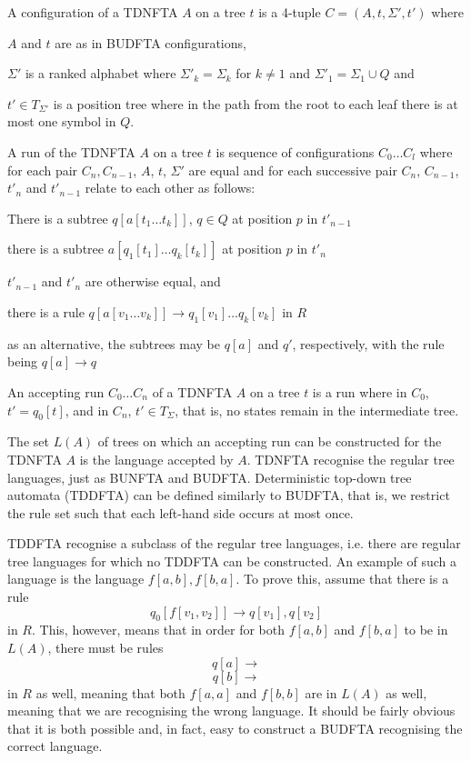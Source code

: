 A configuration of a TDNFTA $A$ on a tree $t$ is a 4-tuple $C = (A, t, \Sigma', t')$
where 
\begin{compactitem}
\item $A$ and $t$ are as in BUDFTA configurations,
\item $\Sigma'$ is a ranked alphabet where $\Sigma'_k = \Sigma_k$ for $k \neq 1$ and
$\Sigma'_1 = \Sigma_1 \cup Q$ and
\item $t' \in T_{\Sigma'}$ is a position tree where in the path from the
root to each leaf there is at most one symbol in $Q$.
\end{compactitem}
\vspace{0.5cm}

A run of the TDNFTA $A$ on a tree $t$ is sequence of configurations $C_0
\ldots C_l$ where for each pair $C_n, C_{n-1}$, $A$, $t$, $\Sigma'$ are
equal and for each successive pair $C_n$, $C_{n-1}$, $t'_n$ and $t'_{n-1}$
relate to each other as follows: 
\begin{compactitem}
\item There is a subtree $q[a[t_1 \ldots t_k]]$, $q \in Q$ at position $p$
in $t'_{n-1}$
\item there is a subtree $a[q_1[t_1] \ldots q_k[t_k]]$ at position $p$ in
$t'_{n}$
\item $t'_{n-1}$ and $t'_n$ are otherwise equal, and
\item there is a rule $q[a[v_1 \ldots v_k]] \rightarrow q_1[v_1] \ldots
q_k[v_k]$ in $R$ 
\item as an alternative, the subtrees may be $q[a]$ and $q'$, respectively,
with the rule being $q[a] \rightarrow q$
\end{compactitem}
\vspace{0.5cm}

An accepting run ${C_0 \ldots C_n}$ of a TDNFTA $A$ on a tree $t$ is a run
where in $C_0$, $t' = q_0[t]$, and in $C_n$, $t' \in T_\Sigma$, that is, no
states remain in the intermediate tree.

The set $L(A)$ of trees on which an accepting run can be constructed for the
TDNFTA $A$ is the language accepted by $A$. TDNFTA recognise the regular
tree languages, just as BUNFTA and BUDFTA. Deterministic top-down tree
automata (TDDFTA) can be defined similarly to BUDFTA, that is, we restrict
the rule set such that each left-hand side occurs at most once.

TDDFTA recognise a subclass of the regular tree languages, i.e. there are
regular tree languages for which no TDDFTA can be constructed. An example
of such a language is the language ${f[a,b], f[b,a]}$. To prove this,
assume that there is a rule $$q_0[f[v_1,v_2]] \rightarrow q[v_1], q[v_2]$$
in $R$. This, however, means that in order for both $f[a,b]$ and $f[b,a]$
to be in $L(A)$, there must be rules
$$q[a] \rightarrow $$
$$q[b] \rightarrow $$
in $R$ as well, meaning that both $f[a,a]$ and $f[b,b]$ are in $L(A)$ as
well, meaning that we are recognising the wrong language. It should be
fairly obvious that it is both possible and, in fact, easy to construct a
BUDFTA recognising the correct language.

